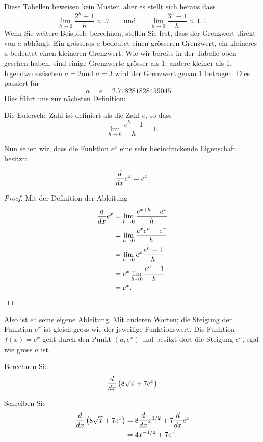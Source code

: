 Diese Tabellen beweisen kein Muster, aber es stellt sich heraus dass
\[
\lim_{h\to 0}\frac{2^h-1}{h} \approx .7 \qquad\text{und}\qquad \lim_{h\to 0} \frac{3^h-1}{h} \approx 1.1.
\]
Wenn Sie weitere Beispiele berechnen, stellen Sie fest, dass der Grenzwert direkt von $a$ abhängt. Ein grösseres $a$ bedeutet einen grösseren Grenzwert, ein kleineres $a$ bedeutet einen kleineren Grenzwert.
Wie wir bereits in der Tabelle oben gesehen haben, sind einige Grenzwerte grösser als 1, andere kleiner als 1. Irgendwo zwischen $a=2$und $a=3$ wird der Grenzwert genau 1 betragen. Dies passiert für
\[
a = e = 2.718281828459045\dots.
\]
Dies führt uns zur nächsten Definition:
\begin{definition}
Die Eulersche Zahl ist definiert als die Zahl $e$, so dass
\[
\lim_{h\to 0} \frac{e^h-1}{h} = 1.
\]
\end{definition}
Nun sehen wir, dass die Funktion $e^x$ eine  sehr beeindruckende Eigenschaft besitzt:

\begin{mainTheorem}
\[
\frac{d}{dx} e^x = e^x.
\]
\end{mainTheorem}
\begin{proof}  
Mit der Definition der Ableitung
\begin{align*}
\frac{d}{dx} e^x&=\lim_{h\to 0} \frac{e^{x+h}-e^x}{h} \\
&=\lim_{h\to 0} \frac{e^xe^{h}-e^x}{h} \\
&=\lim_{h\to 0} e^x\frac{e^{h}-1}{h} \\
&=e^x\lim_{h\to 0} \frac{e^{h}-1}{h} \\
&=e^x.
\end{align*}
\end{proof}


Also ist $e^x$ seine eigene Ableitung. Mit anderen Worten; die Steigung der Funktion $e^x$ ist gleich gross wie der jeweilige Funktionswert. Die Funktion $f(x)=e^x$ geht durch den Punkt $(a,e^x)$ und besitzt dort die Steigung $e^a$, egal wie gross $a$ ist.
 



\begin{example}
Berechnen Sie
\[
\frac{d}{dx}\left(8\sqrt{x} + 7e^x \right)
\]
\end{example}

\begin{solution}
Schreiben Sie
\begin{align*}
\frac{d}{dx}\left(8\sqrt{x} + 7e^x \right) &= 8\frac{d}{dx} x^{1/2} + 7\frac{d}{dx} e^x\\
&= 4x^{-1/2} + 7 e^x.
\end{align*}
\end{solution}


